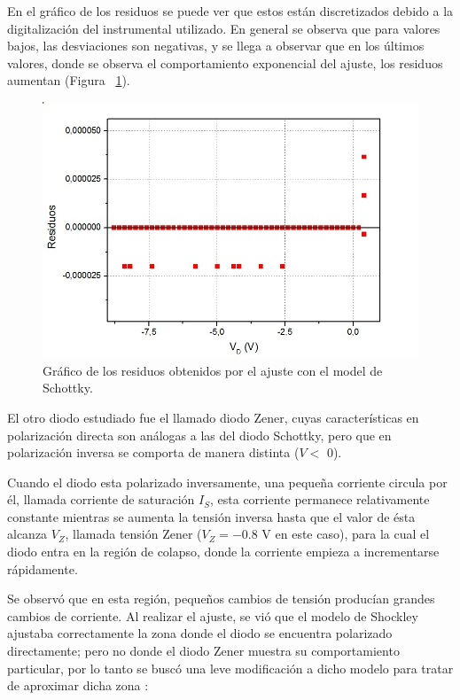 \documentclass[twoside,twocolumn,a4paper]{article}
\begin{document}
En el gr\'afico de los residuos se puede ver que estos est\'an discretizados debido a la digitalizaci\'on del instrumental utilizado. En general se observa que para valores bajos, las desviaciones son negativas, y se llega a observar que en los \'ultimos valores, donde se observa el comportamiento exponencial del ajuste, los residuos aumentan (Figura ~\ref{fig:res}).

\begin{figure}[H]
\includegraphics[width=\linewidth]{residuos.jpg}
\captionsetup{justification=centering}
\caption{Gr\'afico de los residuos obtenidos por el ajuste con el model de Schottky.}
\label{fig:res}
\end{figure} 

El otro diodo estudiado fue el llamado diodo Zener, cuyas caracter\'isticas en polarizaci\'on directa son an\'alogas a las del diodo Schottky, pero que en polarizaci\'on inversa se comporta de manera distinta ($V <$ 0).


Cuando el diodo esta polarizado inversamente, una peque\~na corriente circula por \'el, llamada corriente de saturaci\'on $I_{S}$, esta corriente permanece relativamente constante mientras se aumenta la tensi\'on inversa hasta que el valor de \'esta alcanza $V_{Z}$, llamada tensi\'on Zener ($V_{Z} = - 0.8$ V en este caso), para la cual el diodo entra en la regi\'on de colapso, donde la corriente empieza a incrementarse r\'apidamente.

Se observ\'o que en esta regi\'on, peque\~nos cambios de tensi\'on produc\'ian grandes cambios de corriente. Al realizar el ajuste, se vi\'o que el modelo de Shockley ajustaba correctamente la zona donde el diodo se encuentra polarizado directamente; pero no donde el diodo Zener muestra su comportamiento particular, por lo tanto se busc\'o una leve modificaci\'on a dicho modelo para tratar de aproximar dicha zona \cite{eq:shockley2}:
\end{document}
